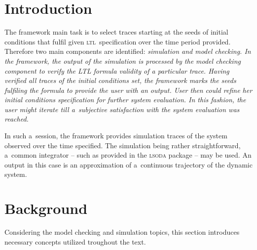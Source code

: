 \documentclass[12pt,oneside,draft]{fithesis}
\newcommand{\ltl}{\textsc{ltl}~}
\begin{document}
\FrontMatter
\ThesisTitlePage

\begin{ThesisDeclaration}
\DeclarationText
\AdvisorName
\end{ThesisDeclaration}




\MainMatter
\tableofcontents
\chapter{Introduction}
The framework main task is to select traces starting at the seeds of
initial conditions that fulfil given \ltl specification over the time
period provided. Therefore two main components are identified:
\em simulation and model checking\rm{}.
In the framework, the output of the simulation is processed by the
model checking component to verify the LTL formula validity of
a particular trace. Having verified all traces of the initial conditions
set, the framework marks the seeds fulfiling the formula to provide
the user with an output. User then could refine her initial conditions
specification for further system evaluation. In this fashion, the user
might iterate till a~subjective satisfaction with the system evaluation
was reached.

In such a~session, the framework provides simulation traces of the
system observed over the time specified. The simulation being rather
straightforward, a~common integrator -- such as provided in the
\textsc{lsoda} \cite{lsoda} package -- may be used.
An output in this case is an approximation of a~continuous trajectory
of the dynamic system.

\chapter{Background}
Considering the model checking and simulation topics, this section
introduces necessary concepts utilized troughout the text.
\end{document}
